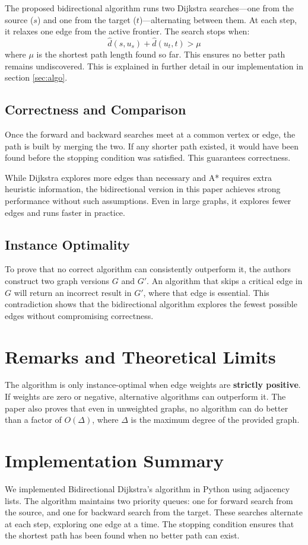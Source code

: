\documentclass[12pt]{article}
\begin{document}
The proposed bidirectional algorithm runs two Dijkstra searches—one from the source ($s$) and one from the target ($t$)—alternating between them. At each step, it relaxes one edge from the active frontier. The search stops when:
\[
\hat{d}(s,u_s) + \hat{d}(u_t, t) > \mu
\]
where \( \mu \) is the shortest path length found so far. This ensures no better path remains undiscovered. This is explained in further detail in our implementation in section \ref{sec:algo}.

\subsection{Correctness and Comparison}
Once the forward and backward searches meet at a common vertex or edge, the path is built by merging the two. If any shorter path existed, it would have been found before the stopping condition was satisfied. This guarantees correctness.

While Dijkstra explores more edges than necessary and A* requires extra heuristic information, the bidirectional version in this paper achieves strong performance without such assumptions. Even in large graphs, it explores fewer edges and runs faster in practice.

\subsection{Instance Optimality}
To prove that no correct algorithm can consistently outperform it, the authors construct two graph versions \( G \) and \( G' \). An algorithm that skips a critical edge in \( G \) will return an incorrect result in \( G' \), where that edge is essential. This contradiction shows that the bidirectional algorithm explores the fewest possible edges without compromising correctness.

\section{Remarks and Theoretical Limits}
The algorithm is only instance-optimal when edge weights are \textbf{strictly positive}. If weights are zero or negative, alternative algorithms can outperform it. The paper also proves that even in unweighted graphs, no algorithm can do better than a factor of $O(\Delta)$, where $\Delta$ is the maximum degree of the provided graph.

\section{Implementation Summary}
We implemented Bidirectional Dijkstra’s algorithm in Python using adjacency lists. The algorithm maintains two priority queues: one for forward search from the source, and one for backward search from the target. These searches alternate at each step, exploring one edge at a time. The stopping condition ensures that the shortest path has been found when no better path can exist. 
\end{document}
